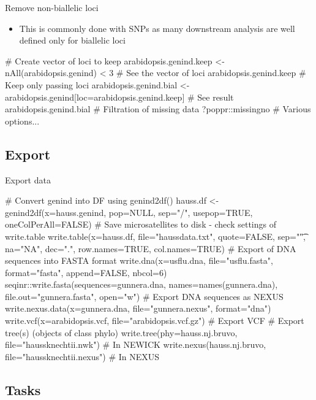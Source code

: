 \documentclass[compress, ucs, xelatex, 11pt, xcolor=svgnames, aspectratio=169,
	hyperref={
		bookmarks=true,
		unicode=true,
		colorlinks=true,
		pdftitle={Molecular data in R},
		plainpages=false,
		pdfauthor={Vojtech Zeisek},
		pdfsubject={Course about phylogeny and evolution in R},
		pdfcreator={XeLaTeX},
		pdfkeywords={R, evolution, phylogeny, molecular data},
		linkcolor=Crimson, %
		anchorcolor=Magenta, %
		citecolor=Magenta, %
		filecolor=Magenta, %
		menucolor=Magenta, %
		urlcolor=DodgerBlue, %
		pdftex},
	url={hyphens, lowtilde} %
	]{beamer}
\begin{document}
\begin{frame}[fragile]{Remove non-biallelic loci}
	\begin{itemize}
		\item This is commonly done with SNPs as many downstream analysis are well defined only for biallelic loci
	\end{itemize}
	\begin{spluscode}
    # Create vector of loci to keep
    arabidopsis.genind.keep <- nAll(arabidopsis.genind) < 3
    # See the vector of loci
    arabidopsis.genind.keep
    # Keep only passing loci
    arabidopsis.genind.bial <-
      arabidopsis.genind[loc=arabidopsis.genind.keep]
    # See result
    arabidopsis.genind.bial
    # Filtration of missing data
    ?poppr::missingno # Various options...
	\end{spluscode}
\end{frame}

\subsection{Export}

\begin{frame}[fragile]{Export data}
	\begin{spluscode}
    # Convert genind into DF using genind2df()
    hauss.df <- genind2df(x=hauss.genind, pop=NULL, sep="/",
      usepop=TRUE, oneColPerAll=FALSE)
    # Save microsatellites to disk - check settings of write.table
    write.table(x=hauss.df, file="haussdata.txt", quote=FALSE,
      sep="\t", na="NA", dec=".", row.names=TRUE, col.names=TRUE)
    # Export of DNA sequences into FASTA format
    write.dna(x=usflu.dna, file="usflu.fasta", format="fasta",
      append=FALSE, nbcol=6)
    seqinr::write.fasta(sequences=gunnera.dna, names=names(gunnera.dna),
      file.out="gunnera.fasta", open="w")
    # Export DNA sequences as NEXUS
    write.nexus.data(x=gunnera.dna, file="gunnera.nexus", format="dna")
    write.vcf(x=arabidopsis.vcf, file="arabidopsis.vcf.gz") # Export VCF
    # Export tree(s) (objects of class phylo)
    write.tree(phy=hauss.nj.bruvo, file="haussknechtii.nwk") # In NEWICK
    write.nexus(hauss.nj.bruvo, file="haussknechtii.nexus") # In NEXUS
	\end{spluscode}
\end{frame}

\subsection{Tasks}
\end{document}
